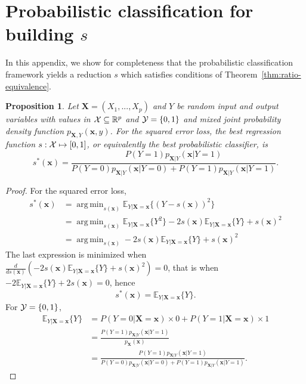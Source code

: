 \documentclass[12pt]{article}
\DeclareMathOperator*{\argmin}{arg\,min}
\numberwithin{equation}{section}
\theoremstyle{plain}
\newtheorem{proposition}[theorem]{Proposition}
\begin{document}



\appendix

\section{Probabilistic classification for building $s$}
\label{app:clf-for-s}

In this appendix, we show for completeness that the probabilistic classification framework
yields a reduction $s$ which satisfies conditions of Theorem~\ref{thm:ratio-equivalence}.

\begin{proposition} \label{thm:best-classifier}
Let $\mathbf{X} = (X_1, ..., X_p)$ and $Y$ be random input and output variables
with values in ${\cal X} \subseteq \mathbb{R}^p$
and ${\cal Y} = \{0, 1\}$ and mixed joint probability density  function
$p_{\mathbf{X},Y}(\mathbf{x}, y)$. For the squared error loss, the best
regression function $s : {\cal X} \mapsto [0, 1]$, or equivalently the best
probabilistic classifier, is
\begin{equation}
s^*(\mathbf{x}) = \frac{P(Y=1) p_{\mathbf{X}|Y}(\mathbf{x}|Y=1)}{P(Y=0) p_{\mathbf{X}|Y}(\mathbf{x} | Y=0) + P(Y=1) p_{\mathbf{X}|Y}(\mathbf{x} | Y=1)}.
\end{equation}
\end{proposition}

\begin{proof}
For the squared error loss,
\begin{align}
s^*(\mathbf{x}) &= \argmin_{s(\mathbf{x})} \mathbb{E}_{Y|\mathbf{X}=\mathbf{x}} \{ (Y - s(\mathbf{x}))^2 \} \nonumber \\
&=  \argmin_{s(\mathbf{x})} \mathbb{E}_{Y|\mathbf{X}=\mathbf{x}} \{ Y^2 \} - 2s(\mathbf{x}) \mathbb{E}_{Y|\mathbf{X}=\mathbf{x}} \{ Y \} + s(\mathbf{x})^2 \nonumber \\
&=  \argmin_{s(\mathbf{x})} -2s(\mathbf{x}) \mathbb{E}_{Y|\mathbf{X}=\mathbf{x}} \{ Y \} + s(\mathbf{x})^2
\end{align}
The last expression is minimized when $\frac{d}{ds(\mathbf{x})} (-2s(\mathbf{x}) \mathbb{E}_{Y|\mathbf{X}=\mathbf{x}} \{ Y \} + s(\mathbf{x})^2) = 0$,
that is when $-2 \mathbb{E}_{Y|\mathbf{X}=\mathbf{x}} \{ Y \} + 2 s(\mathbf{x}) = 0$, hence
\begin{equation}
s^*(\mathbf{x}) = \mathbb{E}_{Y|\mathbf{X}=\mathbf{x}} \{ Y \}.
\end{equation}
For ${\cal Y} = \{ 0, 1 \}$,
\begin{align}
\mathbb{E}_{Y|\mathbf{X}=\mathbf{x}} \{ Y \} &= P(Y=0|\mathbf{X}=\mathbf{x}) \times 0 +  P(Y=1|\mathbf{X}=\mathbf{x}) \times 1 \nonumber \\
&= \frac{P(Y=1) p_{\mathbf{X}|Y}(\mathbf{x}|Y=1)}{p_{\mathbf{X}}(\mathbf{x})} \nonumber \\
&= \frac{P(Y=1) p_{\mathbf{X}|Y}(\mathbf{x}|Y=1)}{P(Y=0) p_{\mathbf{X}|Y}(\mathbf{x} | Y=0) + P(Y=1) p_{\mathbf{X}|Y}(\mathbf{x} | Y=1)}.
\end{align}
\end{proof}
\end{document}
